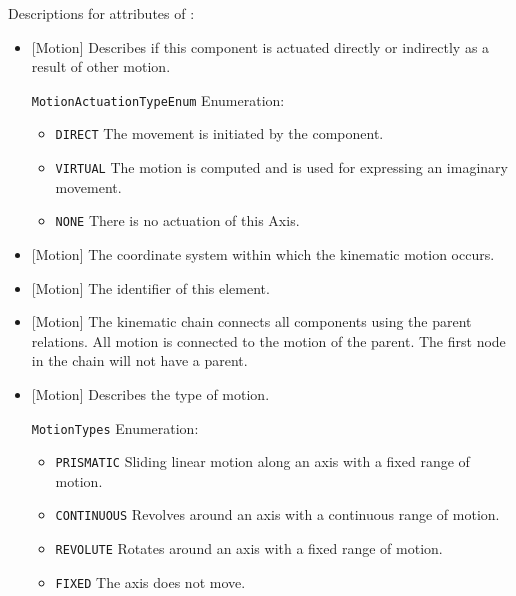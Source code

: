 Descriptions for attributes of :

\begin{itemize}

\item {}[Motion] \newline Describes if this component is actuated directly or indirectly as a result of other motion.

\texttt{MotionActuationTypeEnum} Enumeration:

\begin{itemize}
\item \texttt{DIRECT} \newline The movement is initiated by the component. 
\item \texttt{VIRTUAL} \newline The motion is computed and is used for expressing an imaginary movement. 
\item \texttt{NONE} \newline There is no actuation of this Axis. 
\end{itemize}


\item {}[Motion] \newline The coordinate system within which the kinematic motion occurs.

\item {}[Motion] \newline The identifier of this element.

\item {}[Motion] \newline The kinematic chain connects all components using the parent relations. All motion is connected to the motion of the parent. The first node in the chain will not have a parent.

\item {}[Motion] \newline Describes the type of motion.

\texttt{MotionTypes} Enumeration:

\begin{itemize}
\item \texttt{PRISMATIC} \newline Sliding linear motion along an axis with a fixed range of motion. 
\item \texttt{CONTINUOUS} \newline Revolves around an axis with a continuous range of motion. 
\item \texttt{REVOLUTE} \newline Rotates around an axis with a fixed range of motion. 
\item \texttt{FIXED} \newline The axis does not move. 
\end{itemize}

\end{itemize}


